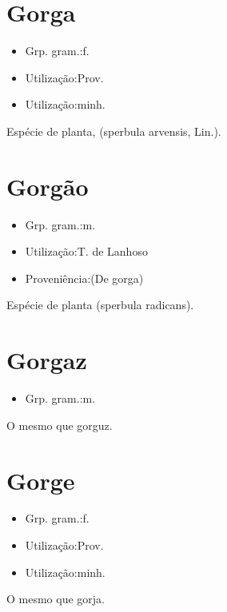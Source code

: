 \section{Gorga}
\begin{itemize}
\item {Grp. gram.:f.}
\end{itemize}
\begin{itemize}
\item {Utilização:Prov.}
\end{itemize}
\begin{itemize}
\item {Utilização:minh.}
\end{itemize}
Espécie de planta, (\textunderscore sperbula arvensis\textunderscore , Lin.).
\section{Gorgão}
\begin{itemize}
\item {Grp. gram.:m.}
\end{itemize}
\begin{itemize}
\item {Utilização:T. de Lanhoso}
\end{itemize}
\begin{itemize}
\item {Proveniência:(De \textunderscore gorga\textunderscore )}
\end{itemize}
Espécie de planta (\textunderscore sperbula radicans\textunderscore ).
\section{Gorgaz}
\begin{itemize}
\item {Grp. gram.:m.}
\end{itemize}
O mesmo que \textunderscore gorguz\textunderscore .
\section{Gorge}
\begin{itemize}
\item {Grp. gram.:f.}
\end{itemize}
\begin{itemize}
\item {Utilização:Prov.}
\end{itemize}
\begin{itemize}
\item {Utilização:minh.}
\end{itemize}
O mesmo que \textunderscore gorja\textunderscore .
